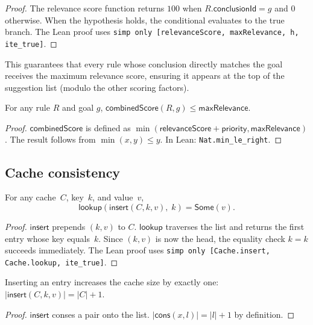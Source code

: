 \documentclass[11pt]{article}
\begin{document}
\begin{proof}
  The relevance score function returns $100$ when
  $R.\mathsf{conclusionId} = g$ and $0$ otherwise.  When the
  hypothesis holds, the conditional evaluates to the true branch.
  The Lean proof uses \texttt{simp only [relevanceScore,
  maxRelevance, h, ite\_true]}.
\end{proof}

\noindent
This guarantees that every rule whose conclusion directly matches
the goal receives the maximum relevance score, ensuring it appears
at the top of the suggestion list (modulo the other scoring
factors).

\begin{lemma}\label{lem:combined-bounded}
  For any rule $R$ and goal $g$,
  $\mathsf{combinedScore}(R, g) \leq \mathsf{maxRelevance}$.
\end{lemma}

\begin{proof}
  $\mathsf{combinedScore}$ is defined as
  $\min(\mathsf{relevanceScore} + \mathsf{priority},
  \mathsf{maxRelevance})$.  The result follows from
  $\min(x, y) \leq y$.  In Lean: \texttt{Nat.min\_le\_right}.
\end{proof}

\subsection{Cache consistency}\label{ssec:cache-formal}

\begin{theorem}\label{thm:cache}
  For any cache~$C$, key~$k$, and value~$v$,
  \[
    \mathsf{lookup}(\mathsf{insert}(C, k, v),\; k) = \mathsf{Some}(v).
  \]
\end{theorem}

\begin{proof}
  $\mathsf{insert}$ prepends $(k, v)$ to $C$.
  $\mathsf{lookup}$ traverses the list and returns the first entry
  whose key equals~$k$.  Since $(k, v)$ is now the head,
  the equality check $k = k$ succeeds immediately.  The Lean proof
  uses \texttt{simp only [Cache.insert, Cache.lookup, ite\_true]}.
\end{proof}

\begin{lemma}\label{lem:cache-grows}
  Inserting an entry increases the cache size by exactly one:
  $|\mathsf{insert}(C, k, v)| = |C| + 1$.
\end{lemma}

\begin{proof}
  $\mathsf{insert}$ conses a pair onto the list.
  $|\mathsf{cons}(x, l)| = |l| + 1$ by definition.
\end{proof}
\end{document}
